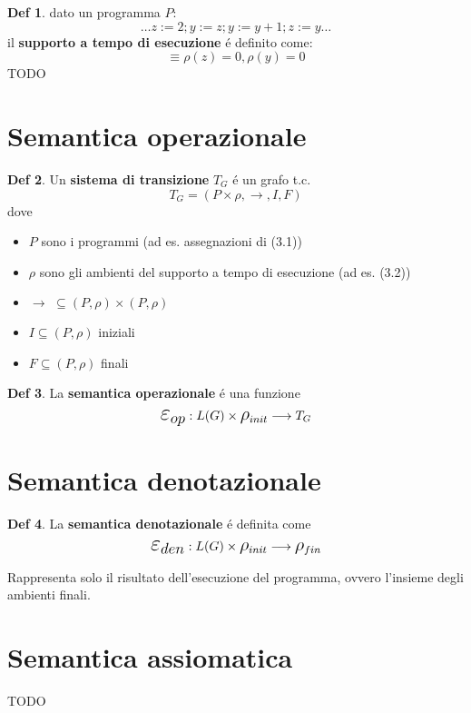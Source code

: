 \documentclass[a4paper]{report}
\theoremstyle{definition} \newtheorem*{defi}{Def}
\theoremstyle{plain} \newtheorem{lemma}{Lemma}
\theoremstyle{plain} \newtheorem{teo}{Teorema}
\theoremstyle{remark} \newtheorem*{es}{Esempio}
\begin{document}
\begin{defi} dato un programma $P$:
\begin{equation}
{\ldots}z:=2; y:=z; y:=y+1; z:=y{\ldots}
\end{equation}
il {\bf supporto a tempo di esecuzione} \'e definito come:
\begin{equation}
[z=0, y=0] \equiv \rho(z) = 0, \rho(y) = 0
\end{equation}
TODO
\end{defi}
\newpage
\section{Semantica operazionale}
\begin{defi}
Un {\bf sistema di transizione} $T_G$ \'e un grafo t.c.
$$
T_G = ( P \times \rho , \longrightarrow , I , F  )
$$
dove
\begin{itemize}
\item $P$ sono i programmi (ad es. assegnazioni di (3.1))
\item $\rho$ sono gli ambienti del supporto a tempo di esecuzione (ad es. (3.2))
\item $ \longrightarrow \, \, \subseteq ( P , \rho ) \times ( P , \rho ) $
\item $ I \subseteq ( P,\rho)$ iniziali
\item $ F \subseteq (P, \rho)$ finali
\end{itemize}
\end{defi}

\begin{defi}
La {\bf semantica operazionale} \'e una funzione
$$
\mathlarger{\mathlarger{\mathlarger{\varepsilon_{op}}}} : L(G) \times \mathlarger{\mathlarger{\rho}}_{init} \longrightarrow T_G
$$
\end{defi}

\section{Semantica denotazionale}
\begin{defi}
La {\bf semantica denotazionale} \'e definita come
$$
\mathlarger{\mathlarger{\mathlarger{\varepsilon_{den}}}} : L(G) \times \mathlarger{\mathlarger{\rho}}_{init} \longrightarrow \mathlarger{\mathlarger{\rho}}_{fin}
$$
\end{defi}
Rappresenta solo il risultato dell'esecuzione del programma, ovvero l'insieme degli ambienti finali.

\section{Semantica assiomatica}
TODO
\end{document}
